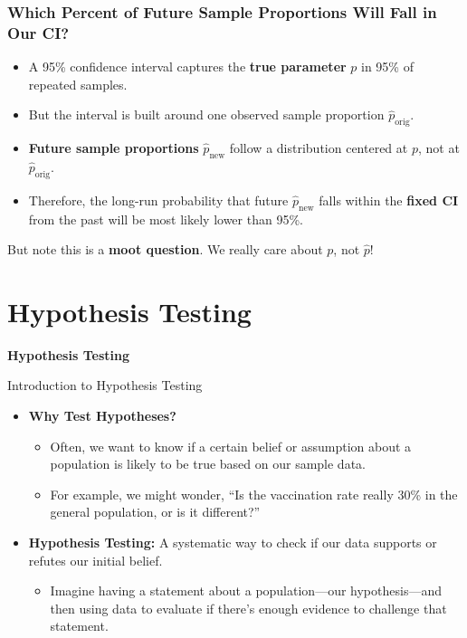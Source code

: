 \documentclass[handout]{beamer} %
\newcommand{\transitionslide}[1]{
    \begin{frame}[plain]
        \centering
        \vspace{1cm}
        \Huge
        \textcolor{moonstoneblue!150}{\textbf{#1}}
    \end{frame}
}
\begin{document}
\begin{frame}
\frametitle{Which Percent of Future Sample Proportions Will Fall in Our CI?}
\begin{itemize}
    \item A 95\% confidence interval captures the \textbf{true parameter} \( p \) in 95\% of repeated samples.
    \item But the interval is built around one observed sample proportion \( \hat{p}_{\text{orig}} \).
    \item \textbf{Future sample proportions} \( \hat{p}_{\text{new}} \) follow a distribution centered at \( p \), not at \( \hat{p}_{\text{orig}} \).
    \item Therefore, the long-run probability that future \( \hat{p}_{\text{new}} \) falls within the \textbf{fixed CI} from the past will be most likely lower than 95\%.
\end{itemize}
But note this is a \textbf{moot question}. We really care about $p$, not $\hat{p}$!
\end{frame}


\section{Hypothesis Testing}
\transitionslide{Hypothesis Testing}

\begin{frame}{Introduction to Hypothesis Testing}
    \begin{itemize}
        \item \textbf{Why Test Hypotheses?}
        \begin{itemize}
            \item Often, we want to know if a certain belief or assumption about a population is likely to be true based on our sample data.
            \item For example, we might wonder, “Is the vaccination rate really 30\% in the general population, or is it different?”
        \end{itemize}

        \item \textbf{Hypothesis Testing:} A systematic way to check if our data supports or refutes our initial belief.
        \begin{itemize}
            \item Imagine having a statement about a population—our hypothesis—and then using data to evaluate if there’s enough evidence to challenge that statement.
        \end{itemize}
    \end{itemize}
\end{frame}
\end{document}
